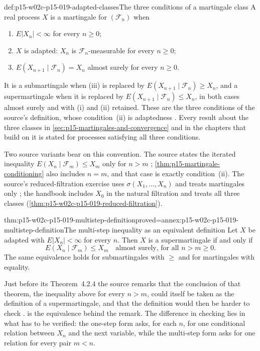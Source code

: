 \begin{hbconvention}{def:p15-w02c-p15-019-adapted-classes}{The three conditions of a martingale class}
A real process \(X\) is a martingale for \((\mathcal F_n)\) when
\begin{enumerate}
\item \(E|X_n|<\infty\) for every \(n\geq0\);
\item \(X\) is adapted: \(X_n\) is \(\mathcal F_n\)-measurable for every
      \(n\geq0\);
\item \(E(X_{n+1}\mid\mathcal F_n)=X_n\) almost surely for every \(n\geq0\).
\end{enumerate}
It is a submartingale when (iii) is replaced by
\(E(X_{n+1}\mid\mathcal F_n)\geq X_n\), and a supermartingale when it is
replaced by \(E(X_{n+1}\mid\mathcal F_n)\leq X_n\), in both cases almost
surely and with (i) and (ii) retained. These are the three conditions of
the source's definition, whose condition~(ii) is adaptedness
\cite[p.~217]{DurrettPTEAuthor2019}. Every result about the three classes
in \cref{sec:p15-martingales-and-convergence} and in the chapters that
build on it is stated for processes satisfying all three conditions.
\end{hbconvention}

Two source variants bear on this convention. The source states the
iterated inequality \(E(X_n\mid\mathcal F_m)\leq X_m\) only for
\(n>m\) \cite[thm.~4.2.4, p.~218]{DurrettPTEAuthor2019};
\cref{thm:p15-martingale-conditioning} also includes \(n=m\), and that
case is exactly condition~(ii). The source's reduced-filtration exercise
uses \(\sigma(X_1,\ldots,X_n)\) and treats martingales only
\cite[ex.~4.2.1, p.~223]{DurrettPTEAuthor2019}; the handbook includes
\(X_0\) in the natural filtration and treats all three classes
(\cref{thm:p15-w02c-p15-019-reduced-filtration}).

\begin{hblemma}{thm:p15-w02c-p15-019-multistep-definition}{proved=annex:p15-w02c-p15-019-multistep-definition}{The multi-step inequality as an equivalent definition}
Let \(X\) be adapted with \(E|X_n|<\infty\) for every \(n\). Then \(X\)
is a supermartingale if and only if
\[
        E(X_n\mid\mathcal F_m)\leq X_m\quad\text{almost surely, for all }
        n>m\geq0 .
\]
The same equivalence holds for submartingales with \(\geq\) and for
martingales with equality.
\end{hblemma}

Just before its Theorem~4.2.4 the source remarks that the conclusion of
that theorem, the inequality above for every \(n>m\), could itself be
taken as the definition of a supermartingale, and that the definition
would then be harder to check \cite[p.~218]{DurrettPTEAuthor2019}.
 is the equivalence
behind the remark. The difference in checking lies in what has to be
verified: the one-step form asks, for each \(n\), for one conditional
relation between \(X_n\) and the next variable, while the multi-step
form asks for one relation for every pair \(m<n\).

